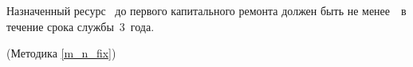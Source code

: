 Назначенный ресурс \dut \ до первого капитального ремонта должен быть не менее~\tnfix \ в течение срока службы~$3$~года.

\begin{flushright}
	(Методика \ref{m_n_fix})
\end{flushright}